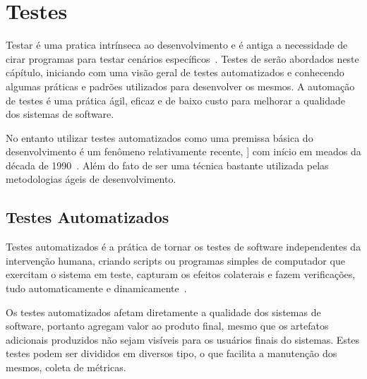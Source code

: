 \chapter{Testes}
\label{cap:testes}

Testar é uma pratica intrínseca ao desenvolvimento e é antiga a necessidade de
cirar programas para testar cenários específicos~\cite{everett2007}. Testes de 
serão abordados neste cápítulo, iniciando com uma visão geral de testes 
automatizados e conhecendo algumas práticas e padrões utilizados para desenvolver
os mesmos.
%
A automação de testes é uma prática ágil, eficaz e de baixo custo para melhorar
a qualidade dos sistemas de software.

No entanto utilizar testes automatizados 
como uma premissa básica do desenvolvimento é um fenômeno relativamente recente, ]
com início em meados  da década de 1990~\cite{cotter1995}.
%
Além do fato de ser uma técnica bastante utilizada pelas metodologias ágeis
de desenvolvimento.


\section{Testes Automatizados}

Testes automatizados é a prática de tornar os testes de software independentes da
intervenção humana, criando scripts ou programas simples de computador que exercitam 
o sistema em teste, capturam os efeitos colaterais e fazem verificações, tudo 
automaticamente e dinamicamente~\cite{meszaros2007}.

Os testes automatizados afetam diretamente a qualidade dos sistemas de software,
portanto agregam valor  ao produto final, mesmo que os artefatos adicionais
produzidos não sejam visíveis para os usuários finais do sistemas.
%
Estes testes podem ser divididos em diversos tipo, o que facilita a manutenção 
dos mesmos, coleta de métricas.

